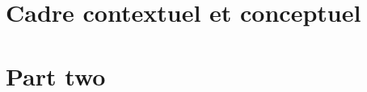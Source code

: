 \documentclass[12pt]{report}
\begin{document}


\listoffigures  %



\tableofcontents

\part{Cadre contextuel et conceptuel}

\part{Part two}


\newpage




\printglossaries
\end{document}
